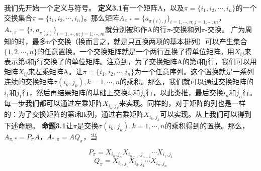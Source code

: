 \documentclass{article}
\begin{document}
我们先开始一个定义与符号。
\newline
\textbf{定义3.1}有一个矩阵A，以及$\pi =\{i_1,i_2,\cdots ,i_n\}$的一个交换集合$\pi =\{i_1,i_2,\cdots ,i_n\}$。那么矩阵$A_{\pi ,*}=\{ a_{\pi(i),j} \}_{i=1,\cdots ,n;j=1,\cdots ,m}$，$A_{*,\pi }=\{i, a_{\pi(j)} \}_{i=1,\cdots ,n;j=1,\cdots ,m}$就分别被称作A的行$\pi$-交换和列$\pi$-交换。
\newline
广为周知的时，最多n个交换（换而言之，就是只互换两项的基本排列）可以产生集合$\{1,2,\cdots,n\}$的任意置换。一个交换矩阵就是一个两行互换了得单位矩阵。用$X_{ij}$来表示第i和j行交换了的单位矩阵。注意到，为了交换矩阵A的第i和j行，我们可以用矩阵$X_{ij}$来左乘矩阵A。让$\pi=\{i_1,i_2,\cdots,i_n\}$为一个任意序列。这个置换就是一系列连续的交换矩阵$\sigma(i_k,j_k),k=1,\cdots,n$的乘积。那么，我们就可以通过交换矩阵的$i_1$和$j_1$行，然后再结果矩阵的基础上交换$i_2$和$j_2$行，以此类推，最后交换$i_n$和$j_n$行。每一步我们都可以通过左乘矩阵$X_{i_k,j_k}$来实现。同样的，对于矩阵的列也是一样的：为了交换矩阵的第i和k列，通过右乘矩阵$X_{i_k,j_k}$可以实现。从上我们可以得到下述命题。
\newline
\textbf{命题3.1}让$\pi$是交换$\sigma(i_k,j_k),k=1,\cdots,n$的乘积得到的置换。那么，$A_{\pi,*}=P_{\pi}A$，$A_{*,\pi}=AQ_{\pi}$，当


\begin{equation}
P_{\pi}=X_{i_n,j_n}X_{i_{n-1},j_{n-1}}\cdots X_{i_1,j_1}  \tag{3.1}
\end{equation}
\begin{equation}
Q_{\pi}=X_{i_1,j_1}X_{i_{2},j_{2}}\cdots X_{i_n,j_n} \tag{3.2}
\end{equation}
\end{document}
